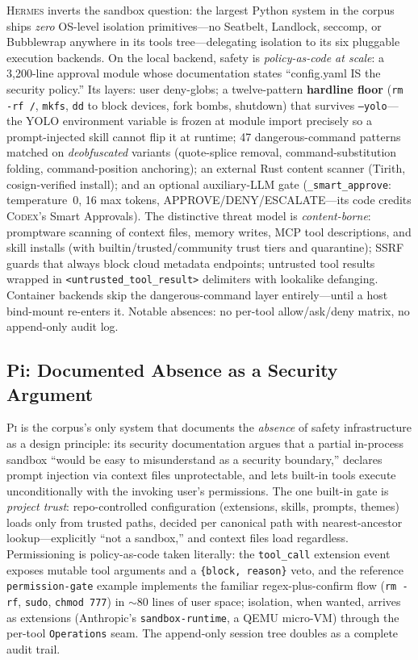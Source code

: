 \documentclass[11pt,a4paper]{article}
\newcommand{\cdx}{\textsc{Codex}\xspace}
\newcommand{\hrm}{\textsc{Hermes}\xspace}
\newcommand{\pib}{\textsc{Pi}\xspace}
\begin{document}
\hrm{} inverts the sandbox question: the largest Python system in the corpus ships \emph{zero} OS-level isolation primitives---no Seatbelt, Landlock, seccomp, or Bubblewrap anywhere in its tools tree---delegating isolation to its six pluggable execution backends.
On the local backend, safety is \emph{policy-as-code at scale}: a 3{,}200-line approval module whose documentation states ``config.yaml IS the security policy.''
Its layers: user deny-globs; a twelve-pattern \textbf{hardline floor} (\texttt{rm -rf /}, \texttt{mkfs}, \texttt{dd} to block devices, fork bombs, shutdown) that survives \texttt{--yolo}---the YOLO environment variable is frozen at module import precisely so a prompt-injected skill cannot flip it at runtime; 47 dangerous-command patterns matched on \emph{deobfuscated} variants (quote-splice removal, command-substitution folding, command-position anchoring); an external Rust content scanner (Tirith, cosign-verified install); and an optional auxiliary-LLM gate (\texttt{\_smart\_approve}: temperature~0, 16 max tokens, APPROVE/DENY/ESCALATE---its code credits \cdx{}'s Smart Approvals).
The distinctive threat model is \emph{content-borne}: promptware scanning of context files, memory writes, MCP tool descriptions, and skill installs (with builtin/trusted/community trust tiers and quarantine); SSRF guards that always block cloud metadata endpoints; untrusted tool results wrapped in \texttt{<untrusted\_tool\_result>} delimiters with lookalike defanging.
Container backends skip the dangerous-command layer entirely---until a host bind-mount re-enters it.
Notable absences: no per-tool allow/ask/deny matrix, no append-only audit log.

\subsection{Pi: Documented Absence as a Security Argument}

\pib{} is the corpus's only system that documents the \emph{absence} of safety infrastructure as a design principle: its security documentation argues that a partial in-process sandbox ``would be easy to misunderstand as a security boundary,'' declares prompt injection via context files unprotectable, and lets built-in tools execute unconditionally with the invoking user's permissions.
The one built-in gate is \emph{project trust}: repo-controlled configuration (extensions, skills, prompts, themes) loads only from trusted paths, decided per canonical path with nearest-ancestor lookup---explicitly ``not a sandbox,'' and context files load regardless.
Permissioning is policy-as-code taken literally: the \texttt{tool\_call} extension event exposes mutable tool arguments and a \texttt{\{block, reason\}} veto, and the reference \texttt{permission-gate} example implements the familiar regex-plus-confirm flow (\texttt{rm -rf}, \texttt{sudo}, \texttt{chmod 777}) in $\sim$80 lines of user space; isolation, when wanted, arrives as extensions (Anthropic's \texttt{sandbox-runtime}, a QEMU micro-VM) through the per-tool \texttt{Operations} seam.
The append-only session tree doubles as a complete audit trail.
\end{document}
